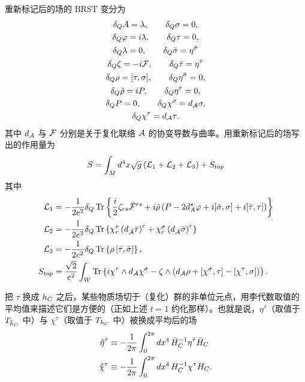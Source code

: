 重新标记后的场的 BRST 变分为
\begin{gather*}
    \delta_QA = \lambda, \qquad \delta_Q\sigma = 0, \\
    \delta_Q\varphi = i\lambda, \qquad \delta_Q\tau = 0, \\
    \delta_Q\lambda = 0, \qquad \delta_Q\bar\sigma = \eta^{\bar\sigma} \\
    \delta_Q\zeta = -i\mathcal{F}, \qquad \delta_Q\bar\tau = \eta^{\bar\tau} \\
    \delta_Q\rho = [\tau,\sigma], \qquad \delta_Q\eta^{\bar\sigma} = 0, \\
    \delta_Q\tilde\rho = i P, \qquad \delta_Q\eta^{\bar\tau} = 0, \\
    \delta_QP = 0, \qquad \delta_Q\chi^\sigma = d_{\mathcal{A}}\sigma, \\
    \delta_Q\chi^\tau = d_{\mathcal{A}}\tau .
\end{gather*}
其中 $d_{\mathcal{A}}$ 与 $\mathcal{F}$ 分别是关于复化联络 $\mathcal{A}$ 的协变导数与曲率。用重新标记后的场写出的作用量为
\[
    S = \int_Md^4x\sqrt{g}\left(\mathcal{L}_1+\mathcal{L}_2+\mathcal{L}_3\right) + S_{top}
\]
其中
\begin{align*}
    \mathcal{L}_1 &= -\frac{1}{2e^2}\delta_Q\operatorname{Tr}\left\{\frac{i}{2}\zeta_{rs}\bar{\mathcal{F}}^{rs}
        + i\tilde\rho\left(P - 2d_A^\star\varphi + i[\bar\sigma,\sigma] + i[\bar\tau,\tau]\right)\right\} \\
    \mathcal{L}_2 &= -\frac{1}{2e^2}\delta_Q\operatorname{Tr}\left\{\chi_r^\tau\left(d_{\bar{\mathcal{A}}}\bar\tau\right)^r
        + \chi_r^\sigma\left(d_{\bar{\mathcal{A}}}\bar\sigma\right)^r\right\} \\
    \mathcal{L}_3 &= -\frac{1}{2e^2}\delta_Q\operatorname{Tr}\left\{\rho\,[\bar\tau,\bar\sigma]\right\}, \\
    S_{top} &= \frac{\sqrt2}{e^2}\int_W\operatorname{Tr}\left\{i\chi^\tau\wedge d_{\mathcal{A}}\chi^\sigma
        - \zeta\wedge\left(d_{\mathcal{A}}\rho + [\chi^\sigma,\tau] - [\chi^\tau,\sigma]\right)\right\} .
\end{align*}


把 $\tau$ 换成 $h_{C}$ 之后，某些物质场切于（复化）群的非单位元点，用李代数取值的平均值来描述它们是方便的（正如上述 $t=1$ 约化那样）。也就是说，$\eta^{\bar\tau}$（取值于 $T_{\bar h_{C}}$ 中）与 $\chi^\tau$（取值于 $T_{h_{C}}$ 中）被换成平均后的场
\begin{align*}
    \hat\eta^{\bar\tau} &\equiv -\frac{1}{2\pi}\int_0^{2\pi}d x^4\, \bar H_{C}^{-1}\eta^{\bar\tau}\bar H_{C} \\
    \hat\chi^\tau &\equiv -\frac{1}{2\pi}\int_0^{2\pi}d x^4\, H_{C}^{-1}\chi^\tau H_{C} .
\end{align*}

